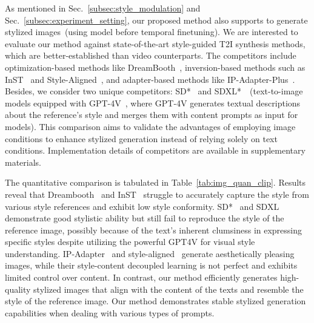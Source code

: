 As mentioned in Sec.~\ref{subsec:style_modulation} and Sec.~\ref{subsec:experiment_setting}, our proposed method also supports to generate stylized images~(using model before temporal finetuning). We are interested to evaluate our method against state-of-the-art style-guided T2I synthesis methods, which are better-established than video counterparts. The competitors include optimization-based methods like DreamBooth~\cite{dreambooth}, inversion-based methods such as InST~\cite{zhang2023inversion} and Style-Aligned~\cite{hertz2023style}, and adapter-based methods like IP-Adapter-Plus~\cite{ye2023ipadapter}. Besides, we consider two unique competitors: SD*~\cite{ldm} and SDXL*~\cite{sdxl}~(text-to-image models equipped with GPT-4V~\cite{openai2023gpt4v}, where GPT-4V generates textual descriptions about the reference's style and merges them with content prompts as input for models). This comparison aims to validate the advantages of employing image conditions to enhance stylized generation instead of relying solely on text conditions.
Implementation details of competitors are available in supplementary materials.

The quantitative comparison is tabulated in Table~\ref{tab:img_quan_clip}. 
Results reveal that Dreambooth~\cite{dreambooth} and InST~\cite{zhang2023inversion} struggle to accurately capture the style from various style references and exhibit low style conformity. SD*~\cite{ldm} and SDXL~\cite{sdxl} demonstrate good stylistic ability but still fail to reproduce the style of the reference image, possibly because of the text’s inherent clumsiness in expressing specific styles despite utilizing the powerful GPT4V for visual style understanding. IP-Adapter~\cite{ye2023ipadapter} and style-aligned~\cite{hertz2023style} generate aesthetically pleasing images, while their style-content decoupled learning is not perfect and exhibits limited control over content.
In contrast, our method efficiently generates high-quality stylized images that align with the content of the texts and resemble the style of the reference image. Our method demonstrates stable stylized generation capabilities when dealing with various types of prompts.


